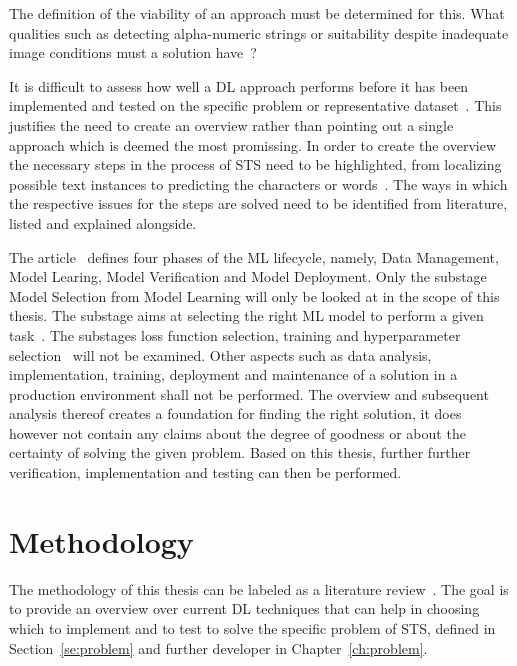 The definition of the viability of an approach must be determined for this.
What qualities such as detecting alpha-numeric strings or suitability despite
inadequate image conditions must a solution have~\citep{ghosh_visual_2017, hu_gtc_2020}?

It is difficult to assess how well a \ac{DL} approach performs before it has been
implemented and tested on the specific problem or representative dataset~\citep{arpteg_software_2018}.
This justifies the need to create an overview rather than pointing out a single approach which is
deemed the most promissing.
In order to create the overview the necessary steps in the process of \ac{STS} need to be highlighted,
from localizing possible text instances to predicting the characters or
words~\citep{long_scene_2021, sourvanos_challenges_2018}.
The ways in which the respective issues for the steps are solved need to be
identified from literature, listed and explained alongside.

The article~\cite{ashmore_assuring_2021} defines four phases of the \ac{ML} lifecycle, namely,
Data Management, Model Learing, Model Verification and Model Deployment.
Only the substage Model Selection from Model Learning will only be looked at in the scope of this
thesis.
The substage aims at selecting the right \ac{ML} model to perform a given
task~\citep{ashmore_assuring_2021}.
The substages loss function selection, training and hyperparameter
selection~\citep{ashmore_assuring_2021} will not be examined.
Other aspects such as data analysis, implementation, training, deployment and maintenance of a
solution in a production environment shall not be performed.
The overview and subsequent analysis thereof creates a foundation for finding the right solution,
it does however not contain any claims about the degree of goodness or about the certainty of
solving the given problem.
Based on this thesis, further further verification, implementation and testing can then be performed.

\section{Methodology}\label{se:methodology}
The methodology of this thesis can be labeled as a literature review~\citep{snyder_literature_2019,
torraco_writing_2005}.
The goal is to provide an overview over current \ac{DL} techniques that can help in
choosing which to implement and to test to solve the specific problem of \ac{STS}, defined in
Section~\ref{se:problem} and further developer in Chapter~\ref{ch:problem}.

